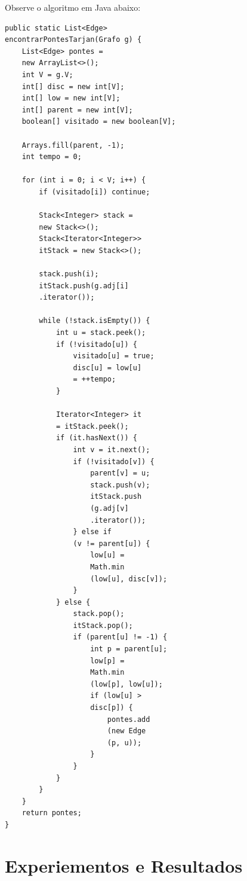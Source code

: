 \documentclass{sbc2023}%
\begin{document}
Observe o algoritmo em Java abaixo:

\begin{lstlisting}[caption={Implementação iterativa do algoritmo de Tarjan para encontrar pontes baseada em \cite{tarjan1972dfs}.}, label={lst:tarjan}]
public static List<Edge> 
encontrarPontesTarjan(Grafo g) {
    List<Edge> pontes = 
    new ArrayList<>();
    int V = g.V;
    int[] disc = new int[V];
    int[] low = new int[V];
    int[] parent = new int[V];
    boolean[] visitado = new boolean[V];

    Arrays.fill(parent, -1);
    int tempo = 0;

    for (int i = 0; i < V; i++) {
        if (visitado[i]) continue;

        Stack<Integer> stack = 
        new Stack<>();
        Stack<Iterator<Integer>> 
        itStack = new Stack<>();

        stack.push(i);
        itStack.push(g.adj[i]
        .iterator());

        while (!stack.isEmpty()) {
            int u = stack.peek();
            if (!visitado[u]) {
                visitado[u] = true;
                disc[u] = low[u] 
                = ++tempo;
            }

            Iterator<Integer> it 
            = itStack.peek();
            if (it.hasNext()) {
                int v = it.next();
                if (!visitado[v]) {
                    parent[v] = u;
                    stack.push(v);
                    itStack.push
                    (g.adj[v]
                    .iterator());
                } else if 
                (v != parent[u]) {
                    low[u] = 
                    Math.min
                    (low[u], disc[v]);
                }
            } else {
                stack.pop();
                itStack.pop();
                if (parent[u] != -1) {
                    int p = parent[u];
                    low[p] = 
                    Math.min
                    (low[p], low[u]);
                    if (low[u] > 
                    disc[p]) {
                        pontes.add
                        (new Edge
                        (p, u));
                    }
                }
            }
        }
    }
    return pontes;
}
\end{lstlisting}

\section{Experiementos e Resultados}
\end{document}
